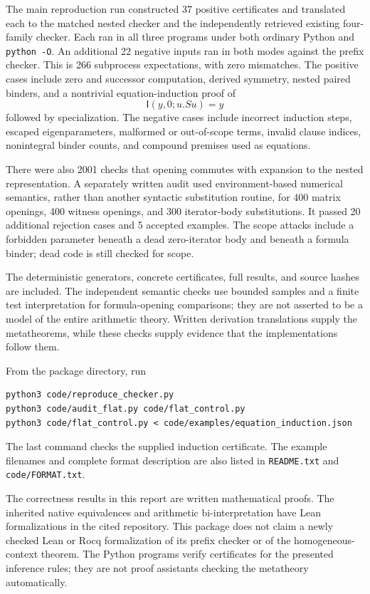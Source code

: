 \documentclass[11pt]{article}
\theoremstyle{definition}\newtheorem{definition}[theorem]{Definition}
\theoremstyle{remark}\newtheorem{remark}[theorem]{Remark}
\newcommand{\I}{\mathsf I}
\newcommand{\code}[1]{\texttt{#1}}
\begin{document}
The main reproduction run constructed 37 positive certificates and
translated each to the matched nested checker and the independently
retrieved existing four-family checker. Each ran in all three programs
under both ordinary Python and \code{python -O}. An additional 22 negative
inputs ran in both modes against the prefix checker. This is 266 subprocess
expectations, with zero mismatches. The positive cases include zero and
successor computation, derived symmetry, nested paired binders, and a
nontrivial equation-induction proof of
\[
 \I(y,0;u.Su)=y
\]
followed by specialization. The negative cases include incorrect induction
steps, escaped eigenparameters, malformed or out-of-scope terms, invalid
clause indices, nonintegral binder counts, and compound premises used as
equations.

There were also 2001 checks that opening commutes with expansion to the
nested representation. A separately written audit used environment-based
numerical semantics, rather than another syntactic substitution routine,
for 400 matrix openings, 400 witness openings, and 300 iterator-body
substitutions. It passed 20 additional rejection cases and 5 accepted
examples. The scope attacks include a forbidden parameter beneath a dead
zero-iterator body and beneath a formula binder; dead code is still
checked for scope.

The deterministic generators, concrete certificates, full results, and
source hashes are included. The independent semantic checks use bounded
samples and a finite test interpretation for formula-opening comparisons;
they are not asserted to be a model of the entire arithmetic theory.
Written derivation translations supply the metatheorems, while these
checks supply evidence that the implementations follow them.

From the package directory, run
\begin{lstlisting}
python3 code/reproduce_checker.py
python3 code/audit_flat.py code/flat_control.py
python3 code/flat_control.py < code/examples/equation_induction.json
\end{lstlisting}
The last command checks the supplied induction certificate. The example
filenames and complete format description are also listed in
\code{README.txt} and \code{code/FORMAT.txt}.


The correctness results in this report are written mathematical proofs.
The inherited native equivalences and arithmetic bi-interpretation have
Lean formalizations in the cited repository. This package does not claim
a newly checked Lean or Rocq formalization of its prefix checker or of
the homogeneous-context theorem. The Python programs verify certificates
for the presented inference rules; they are not proof assistants checking
the metatheory automatically.
\end{document}
